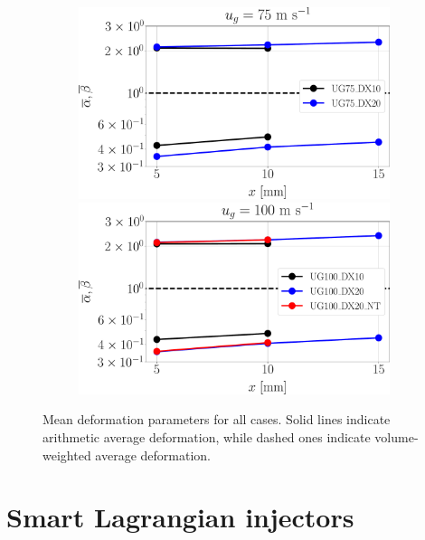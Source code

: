 \begin{figure}[ht]
\flushleft
\begin{subfigure}[b]{1.0\textwidth}
	\flushleft
   \includegraphics[scale=0.225]{./part2_developments/figures_ch5_resolved_JICF/SPRAY_characterization/deformation/ug75_both_alpha_beta_mean}
   \hfill
   \includegraphics[scale=0.225]{./part2_developments/figures_ch5_resolved_JICF/SPRAY_characterization/deformation/ug100_both_alpha_beta_mean}
\end{subfigure}

   \caption[Sampled mean deformation parameters for all cases]{Mean deformation parameters for all cases. Solid lines indicate arithmetic average deformation, while dashed ones indicate volume-weighted average deformation.}
\label{fig:jicf_liquid_mean_deformation_with_x_condensed}
\end{figure}

\clearpage

\section{Smart Lagrangian injectors}
\label{sec:ch5_learning_SLI}

